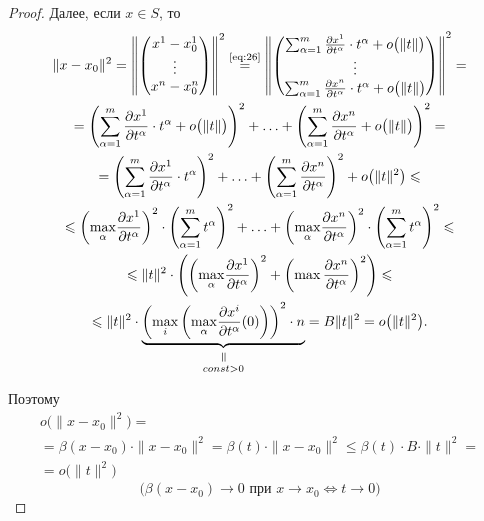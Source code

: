 \begin{proof}
    Далее, если $x\in S$, то
    \begin{multline*}
        \|x-x_0\|^2 = \left\|\left(\begin{matrix}
                x^1 - x_0^1 \\
                \vdots      \\
                x^n - x^n_0
            \end{matrix}\right)\right\|^2 \overset{\text{\ref{eq:26}}}{=} \left\|\left(\begin{matrix}
                \sum_{\alpha=1}^{m}\frac{\partial x^1}{\partial t^\alpha}\cdot t^\alpha + o\big(\|t\|\big) \\
                \vdots                                                                                 \\
                \sum_{\alpha=1}^{m}\frac{\partial x^n}{\partial t^\alpha}\cdot t^\alpha + o\big(\|t\|\big)
            \end{matrix}\right)\right\|^2 = \\
        = \left(\sum_{\alpha = 1}^{m}\frac{\partial x^1}{\partial t^\alpha}\cdot t^\alpha + o\big(\|t\|\big)\right)^2 + \ldots + \left(\sum_{\alpha=1}^{m}\frac{\partial x^n}{\partial t^\alpha} + o\big(\|t\|\big)\right)^2 =\\
        = \left(\sum_{\alpha = 1}^{m}\frac{\partial x^1}{\partial t^\alpha}\cdot t^\alpha \right)^2 + \ldots + \left(\sum_{\alpha=1}^{m}\frac{\partial x^n}{\partial t^\alpha} \right)^2 + o\big(\|t\|^2\big) \leqslant \\
        \leqslant \left( \underset{\alpha}{\max}\frac{\partial x^1}{\partial t^\alpha}\right)^2 \cdot \left(\sum_{\alpha=1}^{m} t^\alpha\right)^2 + \ldots + \left(\underset{\alpha}{\max}\frac{\partial x^n}{\partial t^\alpha}\right)^2\cdot\left(\sum_{\alpha=1}^{m}t^\alpha\right)^2 \leqslant \\
        \leqslant \|t\|^2 \cdot \left(\left(\underset{\alpha}{\max}\frac{\partial x^1}{\partial t^\alpha}\right)^2 + \left(\max \frac{\partial x^n}{\partial t^\alpha}\right)^2\right) \leqslant \\
        \leqslant \|t\|^2 \cdot \equalto{\underbrace{\left(\underset{i}{\max}\left(\underset{\alpha}{\max}\frac{\partial x^i}{\partial t^\alpha}(0)\right)\right)^2 \cdot n}}{const>0} = B\|t\|^2 = o\big(\|t\|^2\big).
    \end{multline*}

    Поэтому
    \begin{multline*}
        o\big(\|x-x_0\|^2\big) = \\
        = \beta(x-x_0)\cdot \|x-x_0\|^2 = \beta(t)\cdot \|x-x_0\|^2 \leqslant \beta(t) \cdot B \cdot \|t\|^2 = \\
        = o\big(\|t\|^2\big)
    \end{multline*}
    \[
        \big(\beta(x-x_0)\rightarrow0\text{ при }x \rightarrow x_0 \iff t \rightarrow 0\big)
    \]
\end{proof}


